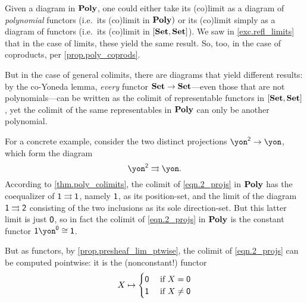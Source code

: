\documentclass[Book-Poly]{subfiles}
\begin{document}
\begin{example}
Given a diagram in $\mathbf{Poly}$, one could either take its (co)limit as a diagram of \emph{polynomial} functors (i.e.\ its (co)limit in $\mathbf{Poly})$ or its (co)limit simply as a diagram of functors (i.e.\ its (co)limit in $[\mathbf{Set},\mathbf{Set}]$).
We saw in \cref{exc.refl_limits} that in the case of limits, these yield the same result.
So, too, in the case of coproducts, per \cref{prop.poly_coprods}.

But in the case of general colimits, there are diagrams that yield different results: by the co-Yoneda lemma, \emph{every} functor $\mathbf{Set} \to \mathbf{Set}$---even those that are not polynomials---can be written as the colimit of representable functors in $[\mathbf{Set},\mathbf{Set}]$, yet the colimit of the same representables in $\mathbf{Poly}$ can only be another polynomial.

For a concrete example, consider the two distinct projections $\yon^\2\to\yon$, which form the diagram
\begin{equation} \label{eqn.2_projs}
    \yon^\2\tto\yon.
\end{equation}
According to \cref{thm.poly_colimits}, the colimit of \eqref{eqn.2_projs} in $\mathbf{Poly}$ has the coequalizer of $\textsf{1} \rightrightarrows \textsf{1}$, namely $\textsf{1}$, as its position-set, and the limit of the diagram $\textsf{1} \rightrightarrows \textsf{2}$ consisting of the two inclusions as its sole direction-set.
But this latter limit is just $\textsf{0}$, so in fact the colimit of \eqref{eqn.2_projs} in $\mathbf{Poly}$ is the constant functor $\1\yon^\0\iso\1$.

But as functors, by \cref{prop.presheaf_lim_ptwise}, the colimit of \eqref{eqn.2_projs} can be computed pointwise: it is the (nonconstant!) functor
\[
  X\mapsto
  \begin{cases}
  	\textsf{0}&\textnormal{ if }X=\textsf{0}\\
  	\textsf{1}&\textnormal{ if }X\neq\textsf{0}
  \end{cases}
\]
\end{example}
\end{document}
